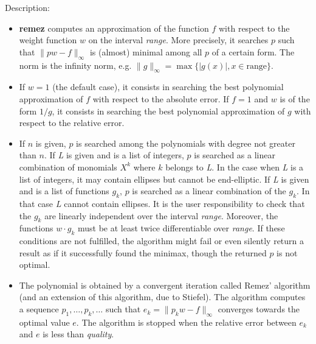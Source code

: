 \noindent Description: \begin{itemize}

\item \textbf{remez} computes an approximation of the function $f$ with respect to
   the weight function $w$ on the interval \emph{range}. More precisely, it
   searches $p$ such that $\|pw-f\|_{\infty}$ is
   (almost) minimal among all $p$ of a certain form. The norm is
   the infinity norm, e.g. $\|g\|_{\infty} = \max \{|g(x)|, x \in \mathrm{range}\}.$

\item If $w=1$ (the default case), it consists in searching the best
   polynomial approximation of $f$ with respect to the absolute error.
   If $f=1$ and $w$ is of the form $1/g$, it consists in
   searching the best polynomial approximation of $g$ with respect to the
   relative error.

\item If $n$ is given, $p$ is searched among the polynomials with degree not
   greater than $n$.
   If \emph{L} is given and is a list of integers, $p$ is searched as a linear
   combination of monomials $X^k$ where $k$ belongs to \emph{L}.
   In the case when \emph{L} is a list of integers, it may contain ellipses but
   cannot be end-elliptic.
   If \emph{L} is given and is a list of functions $g_k$, $p$ is searched as a
   linear combination of the $g_k$. In that case \emph{L} cannot contain ellipses.
   It is the user responsibility to check that the $g_k$ are linearly independent
   over the interval \emph{range}. Moreover, the functions $w\cdot g_k$ must be at least
   twice differentiable over \emph{range}. If these conditions are not fulfilled, the
   algorithm might fail or even silently return a result as if it successfully
   found the minimax, though the returned $p$ is not optimal.

\item The polynomial is obtained by a convergent iteration called Remez'
   algorithm (and an extension of this algorithm, due to Stiefel).
   The algorithm computes a sequence $p_1,\dots ,p_k,\dots$
   such that $e_k = \|p_k w-f\|_{\infty}$ converges towards
   the optimal value $e$. The algorithm is stopped when the relative error
   between $e_k$ and $e$ is less than \emph{quality}.


\end{itemize}
